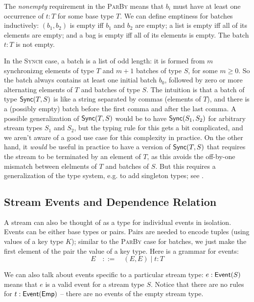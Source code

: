 The \emph{nonempty} requirement in the \textsc{ParBy} means that $b_i$ must have at least one occurrence of $t: T$ for some base type $T$.
We can define emptiness for batches inductively:
$(b_1, b_2)$ is empty iff $b_1$ and $b_2$ are empty;
a list is empty iff all of its elements are empty;
and a bag is empty iff all of its elements is empty.
The batch $t: T$ is not empty.

In the \textsc{Synch} case, a batch is a list of odd length: it is formed from $m$ synchronizng elements of type $T$ and $m + 1$ batches of type $S$, for some $m \ge 0$.
So the batch always contains at least one initial batch $b_0$, followed by zero or more alternating elements of $T$ and batches of type $S$.
The intuition is that a batch of type $\mathsf{Sync}({T}, S)$ is like a string separated by commas (elements of $T$), and there is a (possibly empty) batch before the first comma and after the last comma.
A possible generalization of $\mathsf{Sync}({T}, S)$ would be to have $\mathsf{Sync}({S_1}, S_2)$ for arbitrary stream types $S_1$ and $S_2$, but the typing rule for this gets a bit complicated,
and we aren't aware of a good use case for this complexity in practice.
On the other hand, it \emph{would} be useful in practice to have a version of $\mathsf{Sync}({T}, S)$ that requires the stream to be terminated by an element of $T$, as this avoids the off-by-one mismatch between elelments of $T$ and batches of $S$.
But this requires a generalization of the type system, e.g. to add singleton types; see .

\subsection{Stream Events and Dependence Relation}
\label{view:events}

A stream can also be thought of as a type for individual events in isolation.
Events can be either base types or pairs.
Pairs are needed to encode tuples (using values of a key type $K$); similar to the \textsc{ParBy} case for batches, we just make the first element of the pair the value of a key type.
Here is a grammar for events:
\[
  E \quad ::= \quad (E, E) \mid t: T
\]

We can also talk about events specific to a particular stream type:
$e: \mathsf{Event}({S})$ means that $e$ is a valid event for a stream type $S$.
Notice that there are no rules for $t: \mathsf{Event}({\mathsf{Emp}{}})$ -- there are no events of the empty stream type.

